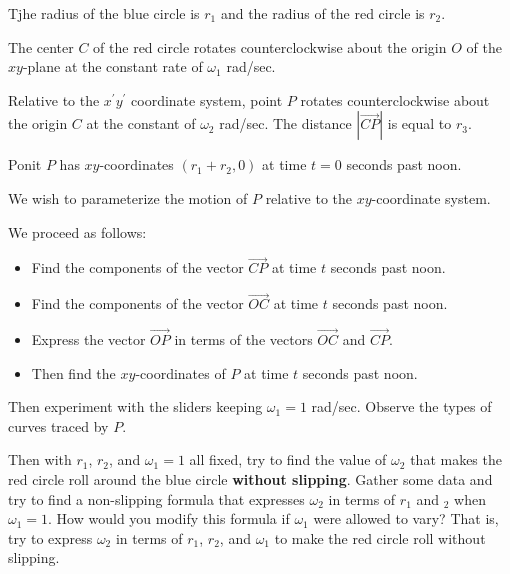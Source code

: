 \documentclass{ximera}
\begin{document}
\begin{exploration}
Tjhe radius of the blue circle is $r_1$ and the radius of the red circle is $r_2$.
 
The center $C$ of the red circle rotates counterclockwise about the origin $O$ of the $xy$-plane at the constant rate of $\omega_1$ rad/sec.

Relative to the $x^\prime y^\prime$ coordinate system, point $P$ rotates counterclockwise about the origin $C$ at the constant
of $\omega_2$ rad/sec. The distance $|\overrightarrow{CP}|$ is equal to $r_3$.

Ponit $P$ has $xy$-coordinates $(r_1 + r_2 , 0)$ at time $t=0$ seconds past noon.

We wish to parameterize the motion of $P$ relative to the $xy$-coordinate system.

We proceed as follows:

\begin{itemize}

\item{Find the components of the vector $\overrightarrow{CP}$ at time $t$ seconds past noon.}

\item{Find the components of the vector $\overrightarrow{OC}$ at time $t$ seconds past noon.}


\item{Express the vector $\overrightarrow{OP}$ in terms of the vectors $\overrightarrow{OC}$ and $\overrightarrow{CP}$.}



\item{Then find the $xy$-coordinates of $P$ at time $t$ seconds past noon.}

\end{itemize}

Then experiment with the sliders keeping $\omega_1 = 1$ rad/sec. Observe the types of curves traced by $P$.

Then with $r_1$, $r_2$, and $\omega_1=1$ all fixed, try to find the value of $\omega_2$ that makes the red circle roll around the blue circle {\bf without slipping}. Gather some data and try to find a non-slipping formula that expresses $\omega_2$ in terms of $r_1$ and $_2$ when $\omega_1=1$. How would you modify this formula if $\omega_1$ were allowed to vary? That is, try to express $\omega_2$ in terms of $r_1$, $r_2$, and $\omega_1$ to make the red circle roll without slipping.


\end{exploration}
\end{document}
